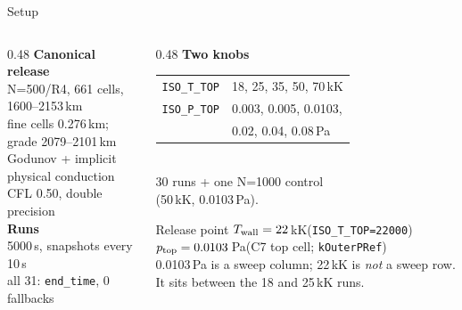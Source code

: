 \documentclass[aspectratio=169,10pt]{beamer}
\newcommand{\Twall}{T_{\rm wall}}
\newcommand{\ptop}{p_{\rm top}}
\begin{document}
\begin{frame}{Setup}
  \begin{columns}[T]
    \begin{column}{0.48\textwidth}
      \textbf{Canonical release}\\[4pt]
      \small
      N=500/R4, 661 cells, 1600--2153\,km\\
      fine cells 0.276\,km; grade 2079--2101\,km\\
      Godunov + implicit physical conduction\\
      CFL 0.50, double precision\\[8pt]
      \textbf{Runs}\\[4pt]
      5000\,s, snapshots every 10\,s\\
      all 31: \texttt{end\_time}, 0 fallbacks
    \end{column}
    \begin{column}{0.48\textwidth}
      \textbf{Two knobs}\\[4pt]
      \begin{tabular}{@{}ll@{}}
        \toprule
        \texttt{ISO\_T\_TOP} & 18, 25, 35, 50, 70\,kK \\
        \texttt{ISO\_P\_TOP} & 0.003, 0.005, 0.0103,\\
          & 0.02, 0.04, 0.08\,Pa \\
        \bottomrule
      \end{tabular}\\[8pt]
      \small
      30 runs + one N=1000 control\\ (50\,kK, 0.0103\,Pa).\\[10pt]
      \begin{block}{Release point}
        \footnotesize
        $\Twall = 22$\,kK\quad(\texttt{ISO\_T\_TOP=22000})\\
        $\ptop = 0.0103$\,Pa\quad(C7 top cell; \texttt{kOuterPRef})\\[3pt]
        0.0103\,Pa is a sweep column; 22\,kK is \emph{not} a sweep row. It
        sits between the 18 and 25\,kK runs.
      \end{block}
    \end{column}
  \end{columns}
\end{frame}
\end{document}
